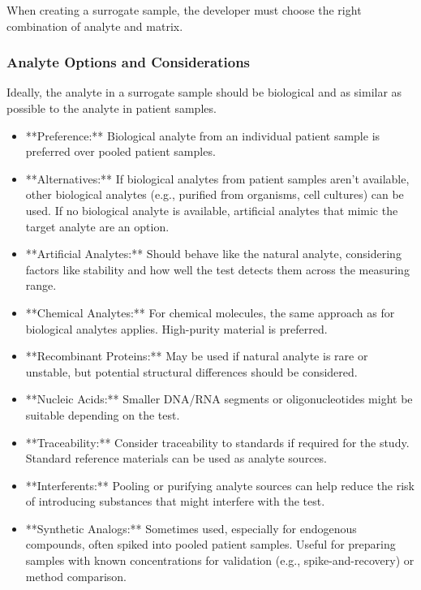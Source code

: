 \documentclass{article}
\begin{document}
When creating a surrogate sample, the developer must choose the right combination of analyte and matrix.

\subsubsection{Analyte Options and Considerations}

Ideally, the analyte in a surrogate sample should be biological and as similar as possible to the analyte in patient samples.
\begin{itemize}
    \item **Preference:** Biological analyte from an individual patient sample is preferred over pooled patient samples.
    \item **Alternatives:** If biological analytes from patient samples aren't available, other biological analytes (e.g., purified from organisms, cell cultures) can be used. If no biological analyte is available, artificial analytes that mimic the target analyte are an option.
    \item **Artificial Analytes:** Should behave like the natural analyte, considering factors like stability and how well the test detects them across the measuring range.
    \item **Chemical Analytes:** For chemical molecules, the same approach as for biological analytes applies. High-purity material is preferred.
    \item **Recombinant Proteins:** May be used if natural analyte is rare or unstable, but potential structural differences should be considered.
    \item **Nucleic Acids:** Smaller DNA/RNA segments or oligonucleotides might be suitable depending on the test.
    \item **Traceability:** Consider traceability to standards if required for the study. Standard reference materials can be used as analyte sources.
    \item **Interferents:** Pooling or purifying analyte sources can help reduce the risk of introducing substances that might interfere with the test.
    \item **Synthetic Analogs:** Sometimes used, especially for endogenous compounds, often spiked into pooled patient samples. Useful for preparing samples with known concentrations for validation (e.g., spike-and-recovery) or method comparison.
\end{itemize}
\end{document}

